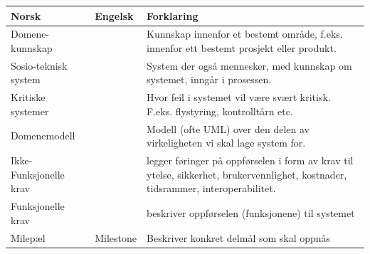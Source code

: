 \documentclass[11pt]{article}
\begin{document}
\begin{center}
\begin{tabular}{lll}
\hline
 \textbf{Norsk}          &  \textbf{Engelsk}  &  \textbf{Forklaring}                                                                                                               \\
\hline
 Domene-kunnskap         &                    &  Kunnskap innenfor et bestemt område, f.eks. innenfor ett bestemt prosjekt eller produkt.                                          \\
 Sosio-teknisk system    &                    &  System der også mennesker, med kunnskap om systemet, inngår i prosessen.                                                          \\
 Kritiske systemer       &                    &  Hvor feil i systemet vil være svært kritisk. F.eks. flystyring, kontrolltårn etc.                                                 \\
 Domenemodell            &                    &  Modell (ofte UML) over den delen av virkeligheten vi skal lage system for.                                                        \\
 Ikke-Funksjonelle krav  &                    &  legger føringer på oppførselen i form av krav til ytelse, sikkerhet, brukervennlighet, kostnader, tidsrammer, interoperabilitet.  \\
 Funksjonelle krav       &                    &  beskriver oppførselen (funksjonene) til systemet                                                                                  \\
 Milepæl                 &  Milestone         &  Beskriver konkret delmål som skal oppnås                                                                                          \\
\hline
\end{tabular}
\end{center}
\end{document}
